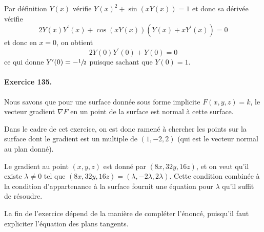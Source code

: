 Par définition $Y(x)$ vérifie $Y(x)^2 + \sin(x Y(x))  = 1$ et donc sa
dérivée vérifie
\begin{equation*}
2 Y(x) Y^\prime(x) + \cos(x Y(x)) (Y(x) + x Y^\prime(x)) = 0
\end{equation*}
et donc en $x = 0$, on obtient
\begin{equation*}
2 Y(0) Y^\prime(0) + Y(0) = 0
\end{equation*}
ce qui donne $Y^\prime(0) = -\sfrac{1}{2}$ puisque sachant que $Y(0) =
1$.

\paragraph{Exercice 135.}

Nous savons que pour une surface donnée sous forme implicite $F(x,y,z) =
k$, le vecteur gradient $\nabla F$ en un point de la surface est normal
à cette surface.

Dans le cadre de cet exercice, on est donc ramené à chercher les
points sur la surface dont le gradient est un multiple de $(1,-2,2)$
(qui est le vecteur normal au plan donné).

Le gradient au point $(x,y,z)$ est donné par $(8x,32y,16z)$, et on
veut qu'il existe $\lambda \neq 0$ tel que $(8x,32y,16z) =
(\lambda,-2\lambda,2\lambda)$. Cette condition combinée à la condition
d'appartenance à la surface fournit une équation pour $\lambda$ qu'il
suffit de résoudre.

La fin de l'exercice dépend de la manière de compléter l'énoncé,
puisqu'il faut expliciter l'équation des plans tangents.

